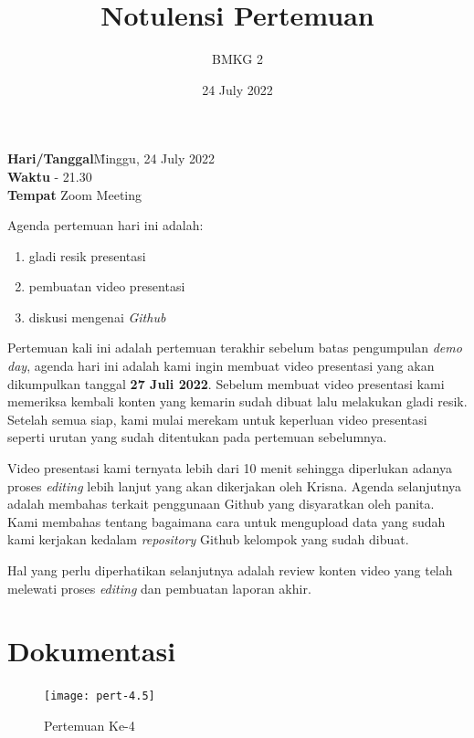 \documentclass[12pt, a4paper]{article}
\title{Notulensi Pertemuan}
\author{BMKG 2}
\date{24 July 2022}
\begin{document}
\maketitle

\begin{tabbing}
\textbf{Hari/Tanggal}\quad\= Minggu, 24 July 2022 \\
\textbf{Waktu}  - 21.30 \\
\textbf{Tempat}\> Zoom Meeting
\end{tabbing}

Agenda pertemuan hari ini adalah:
\begin{enumerate}
\item gladi resik presentasi
\item pembuatan video presentasi
\item diskusi mengenai \emph{Github}
\end{enumerate}

\bigskip 
Pertemuan kali ini adalah pertemuan terakhir sebelum batas pengumpulan \emph{demo day}, agenda hari ini adalah kami ingin membuat video presentasi yang akan dikumpulkan tanggal \textbf{27 Juli 2022}. Sebelum membuat video presentasi kami memeriksa kembali konten yang kemarin sudah dibuat lalu melakukan gladi resik. Setelah semua siap, kami mulai merekam untuk keperluan video presentasi seperti urutan yang sudah ditentukan pada pertemuan sebelumnya.

\medskip
Video presentasi kami ternyata lebih dari 10 menit sehingga diperlukan adanya proses \emph{editing} lebih lanjut yang akan dikerjakan oleh Krisna. Agenda selanjutnya adalah membahas terkait penggunaan Github yang disyaratkan oleh panita. Kami membahas tentang bagaimana cara untuk mengupload data yang sudah kami kerjakan kedalam \emph{repository} Github kelompok yang sudah dibuat.

\medskip
Hal yang perlu diperhatikan selanjutnya adalah review konten video yang telah melewati proses \emph{editing} dan pembuatan laporan akhir.


\bigskip
\section*{Dokumentasi}

\begin{figure}[h]
    \centering
    \texttt{[image: pert-4.5]}
    \caption{Pertemuan Ke-4}
\end{figure}
\end{document}
